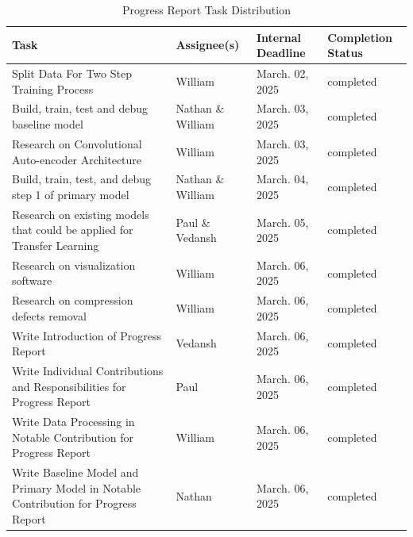 \documentclass{article} %
\begin{document}
\begin{table}[t]
    \caption{Progress Report Task Distribution}
    \label{Progress_Report_Task_Distribution}
    \begin{center}
    \begin{tabularx}{\textwidth}{|>{\raggedright\arraybackslash}X|>{\raggedright\arraybackslash}X|>{\raggedright\arraybackslash}X|>{\raggedright\arraybackslash}X|}
    \hline
    \textbf{Task} & \textbf{Assignee(s)} & \textbf{Internal Deadline} & \textbf{Completion Status} \\
    \hline
    Split Data For Two Step Training Process & William & March. 02, 2025 & completed \\
    \hline
    Build, train, test and debug baseline model & Nathan \& William & March. 03, 2025 & completed \\
    \hline
    Research on Convolutional Auto-encoder Architecture & William & March. 03, 2025 & completed \\
    \hline
    Build, train, test, and debug step 1 of primary model & Nathan \& William & March. 04, 2025 & completed \\
    \hline
    Research on existing models that could be applied for Transfer Learning & Paul \& Vedansh & March. 05, 2025 & completed \\
    \hline
    Research on visualization software & William & March. 06, 2025 & completed \\
    \hline
    Research on compression defects removal & William & March. 06, 2025 & completed \\
    \hline
    Write Introduction of Progress Report & Vedansh & March. 06, 2025 & completed \\
    \hline
    Write Individual Contributions and Responsibilities for Progress Report & Paul & March. 06, 2025 & completed \\
    \hline
    Write Data Processing in Notable Contribution for Progress Report & William & March. 06, 2025 & completed \\
    \hline
    Write Baseline Model and Primary Model in Notable Contribution for Progress Report & Nathan & March. 06, 2025 & completed \\
    \hline
    \end{tabularx}
    \end{center}
    \end{table}
\end{document}
